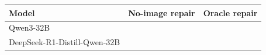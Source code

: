 \begin{tabular}{@{}lrr@{}}
\toprule
Model & No-image repair & Oracle repair\\
\midrule
Qwen3-32B &  & \\
DeepSeek-R1-Distill-Qwen-32B &  & \\
\bottomrule
\end{tabular}
